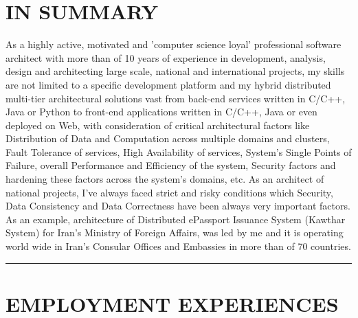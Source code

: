 \documentclass[10pt,a4paper]{article}
\begin{document}
\thispagestyle{fancy}

\section{IN SUMMARY}
As a highly active, motivated and 'computer science loyal' professional software architect with more than of 10 years of experience in development, analysis, design and architecting large scale, national and international projects, my skills are not limited to a specific development platform and my hybrid distributed multi-tier architectural solutions vast from back-end services written in C/C++, Java or Python to front-end applications written in C/C++, Java or even deployed on Web, with consideration of critical architectural factors like Distribution of Data and Computation across multiple domains and clusters, Fault Tolerance of services, High Availability of services, System's Single Points of Failure, overall Performance and Efficiency of the system, Security factors and hardening these factors across the system's domains, etc. As an architect of national projects, I've always faced strict and risky conditions which Security, Data Consistency and Data Correctness have been always very important factors. As an example, architecture of Distributed ePassport Issuance System (Kawthar System) for Iran's Ministry of Foreign Affairs, was led by me and it is operating world wide in Iran's Consular Offices and Embassies in more than of 70 countries.

\rule {14cm}{0.4pt}

\section{EMPLOYMENT EXPERIENCES}
\end{document}
